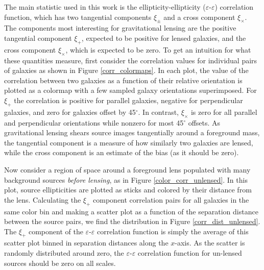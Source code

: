 \documentclass[%
 reprint,
 amsmath,amssymb,
 aps,nofootinbib
]{revtex4-1}
\begin{document}
The main statistic used in this work is the ellipticity-ellipticity ($\varepsilon$-$\varepsilon$) correlation function, which has two tangential components $\xi_\pm$ and a cross component $\xi_\times$. The components most interesting for gravitational lensing are the positive tangential component $\xi_+$, expected to be positive for lensed galaxies, and the cross component $\xi_\times$, which is expected to be zero. To get an intuition for what these quantities measure, first consider the correlation values for individual pairs of galaxies as shown in Figure \ref{corr_colormaps}. In each plot, the value of the correlation between two galaxies as a function of their relative orientation is plotted as a colormap with a few sampled galaxy orientations superimposed. For $\xi_+$ the correlation is positive for parallel galaxies, negative for perpendicular galaxies, and zero for galaxies offset by 45$^\circ$. In contrast, $\xi_\times$ is zero for all parallel and perpendicular orientations while nonzero for most 45$^\circ$ offsets. As gravitational lensing shears source images tangentially around a foreground mass, the tangential component is a measure of how similarly two galaxies are lensed, while the cross component is an estimate of the bias (as it should be zero).

Now consider a region of space around a foreground lens populated with many background sources \textit{before lensing}, as in Figure \ref{color_corr_unlensed}. In this plot, source ellipticities are plotted as sticks and colored by their distance from the lens. Calculating the $\xi_+$ component correlation pairs for all galaxies in the same color bin and making a scatter plot as a function of the separation distance between the source pairs, we find the distribution in Figure \ref{corr_dist_unlensed}. The $\xi_+$ component of the $\varepsilon$-$\varepsilon$ correlation function is simply the average of this scatter plot binned in separation distances along the $x$-axis. As the scatter is randomly distributed around zero, the $\varepsilon$-$\varepsilon$ correlation function for un-lensed sources should be zero on all scales.
\end{document}
